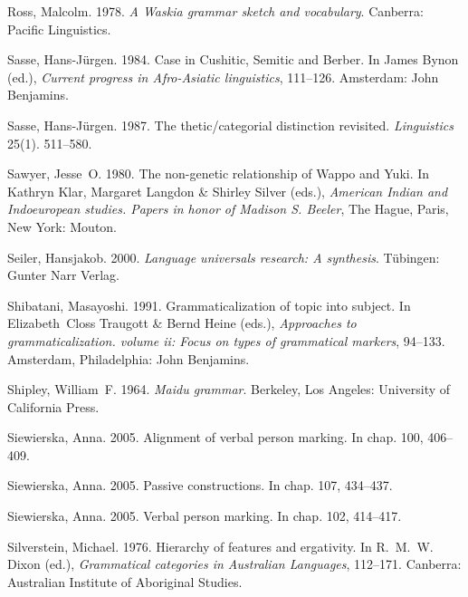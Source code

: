 \documentclass[ number=1
			   ,series=sidl
				,url=http://langsci-press.org/catalog/book/18 
			   ,isbn=978-3-944675-19-0
			   ,output=long   %
			  ]{LSP/langsci}
\begin{document}
\begin{thebibliography}{190}
Ross, Malcolm. 1978.
\newblock \emph{A {W}askia grammar sketch and vocabulary}.
\newblock Canberra: Pacific Linguistics.

Sasse, Hans-J{\"u}rgen. 1984.
\newblock Case in {C}ushitic, {S}emitic and {B}erber.
\newblock In James Bynon (ed.), \emph{Current progress in {A}fro-{A}siatic
  linguistics}, 111--126. Amsterdam: John Benjamins.

Sasse, Hans-J\"urgen. 1987.
\newblock The thetic/categorial distinction revisited.
\newblock \emph{Linguistics} 25(1). 511--580.

Sawyer, Jesse~O. 1980.
\newblock The non-genetic relationship of {W}appo and {Y}uki.
\newblock In Kathryn Klar, Margaret Langdon \& Shirley Silver (eds.),
  \emph{American {I}ndian and {I}ndoeuropean studies. {P}apers in honor of
  {M}adison {S.} {B}eeler}, The Hague, Paris, New York: Mouton.

Seiler, Hansjakob. 2000.
\newblock \emph{Language universals research: {A} synthesis}.
\newblock T\"ubingen: Gunter Narr Verlag.

Shibatani, Masayoshi. 1991.
\newblock Grammaticalization of topic into subject.
\newblock In Elizabeth~Closs Traugott \& Bernd Heine (eds.), \emph{Approaches
  to grammaticalization. volume ii: {F}ocus on types of grammatical markers},
  94--133. Amsterdam, Philadelphia: John Benjamins.

Shipley, William~F. 1964.
\newblock \emph{{M}aidu grammar}.
\newblock Berkeley, Los Angeles: University of California Press.

Siewierska, Anna. 2005{}.
\newblock Alignment of verbal person marking.
\newblock In  \cite{WALS} chap. 100, 406--409.

Siewierska, Anna. 2005{}.
\newblock Passive constructions.
\newblock In  \cite{WALS} chap. 107, 434--437.

Siewierska, Anna. 2005{}.
\newblock Verbal person marking.
\newblock In  \cite{WALS} chap. 102, 414--417.

Silverstein, Michael. 1976.
\newblock Hierarchy of features and ergativity.
\newblock In R.~M.~W. Dixon (ed.), \emph{Grammatical categories in {A}ustralian
  {L}anguages}, 112--171. Canberra: Australian Institute of Aboriginal Studies.


\end{thebibliography}
\end{document}
